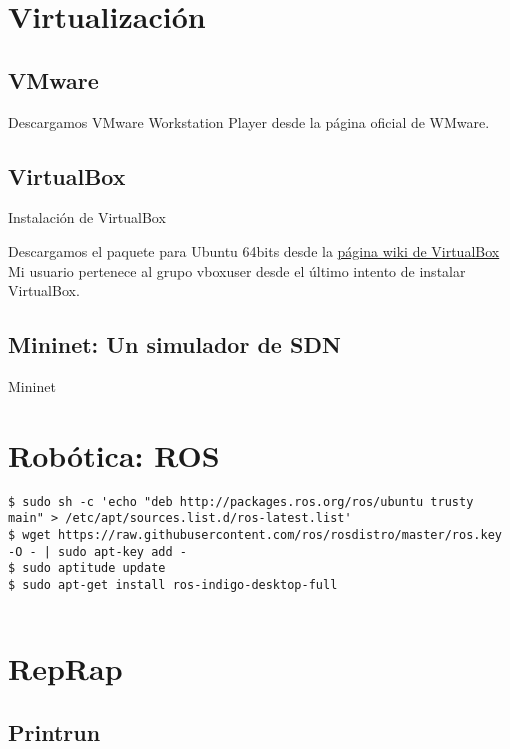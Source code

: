 \section{Virtualización}\label{virtualizaciuxf3n-1}

\subsection{VMware}\label{vmware}

Descargamos VMware Workstation Player desde la página oficial de WMware.

\subsection{VirtualBox}\label{virtualbox-1}

Instalación de VirtualBox

Descargamos el paquete para Ubuntu 64bits desde la
\href{https://www.virtualbox.org/wiki/Linux_Downloads}{página wiki de
VirtualBox} Mi usuario pertenece al grupo vboxuser desde el último
intento de instalar VirtualBox.

\subsection{Mininet: Un simulador de
SDN}\label{mininet-un-simulador-de-sdn}

Mininet

\section{Robótica: ROS}\label{robuxf3tica-ros}

\begin{verbatim}
$ sudo sh -c 'echo "deb http://packages.ros.org/ros/ubuntu trusty main" > /etc/apt/sources.list.d/ros-latest.list'
$ wget https://raw.githubusercontent.com/ros/rosdistro/master/ros.key -O - | sudo apt-key add -
$ sudo aptitude update
$ sudo apt-get install ros-indigo-desktop-full
    
\end{verbatim}

\section{RepRap}\label{reprap}

\subsection{Printrun}\label{printrun}

